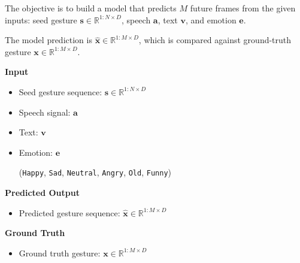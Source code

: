 The objective is to build a model that predicts $M$ future frames from the given inputs: seed gesture $\mathbf{s} \in \mathbb{R}^{1:N \times D}$, speech $\mathbf{a}$, text $\mathbf{v}$, and emotion $\mathbf{e}$.

The model prediction is $\hat{\mathbf{x}} \in \mathbb{R}^{1:M \times D}$, which is compared against ground-truth gesture $\mathbf{x} \in \mathbb{R}^{1:M \times D}$.

%
%


\begin{multicols}{2}
	\textbf{Input}
	
	\begin{itemize}
		\item Seed gesture sequence: $\mathbf{s} \in \mathbb{R}^{1:N \times D}$
		\item Speech signal: $\mathbf{a}$
		\item Text: $\mathbf{v}$
		\item Emotion: $\mathbf{e}$ 
		
		{\small
			(\texttt{Happy},  \texttt{Sad},  \texttt{Neutral}, \texttt{Angry}, \texttt{Old}, \texttt{Funny})
		}
	\end{itemize}
	
	\columnbreak
	
	\textbf{Predicted Output}
	\begin{itemize}
		\item Predicted gesture sequence:
		$\hat{\mathbf{x}} \in \mathbb{R}^{1:M \times D}$
	\end{itemize}
	
	\textbf{Ground Truth}
	\begin{itemize}
		\item Ground truth gesture: $ \mathbf{x}  \in \mathbb{R}^{1:M \times D}$
	\end{itemize}
\end{multicols}


